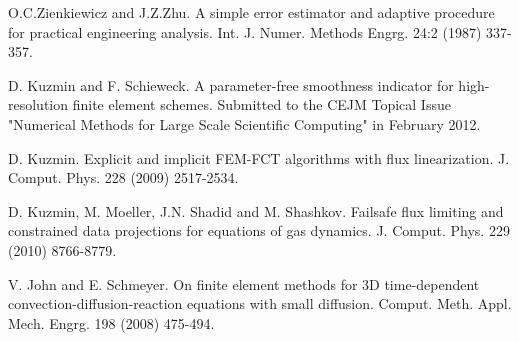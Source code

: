 
\begin{thebibliography}{10}

{\sc O.C.Zienkiewicz and J.Z.Zhu}. {A simple error estimator and adaptive procedure for practical engineering analysis}. Int. J. Numer. Methods Engrg. 24:2 (1987) 337-357.


{\sc D. Kuzmin and F. Schieweck}. {A parameter-free smoothness indicator for high-resolution finite element schemes}. Submitted to the CEJM Topical Issue "Numerical Methods
for Large Scale Scientific Computing" in February 2012. 


{\sc D. Kuzmin}. {Explicit and implicit FEM-FCT algorithms with flux linearization}. J. Comput. Phys. 228 (2009) 2517-2534.



{\sc D. Kuzmin, M. Moeller, J.N. Shadid and M. Shashkov}. {Failsafe flux limiting and constrained data projections for equations of gas dynamics}. J. Comput. Phys. 229 (2010) 8766-8779.



{\sc V. John and E. Schmeyer}. {On finite element methods for 3D time-dependent convection-diffusion-reaction equations with small diffusion}. Comput. Meth. Appl. Mech. Engrg. 198 (2008) 475-494.

\end{thebibliography}
